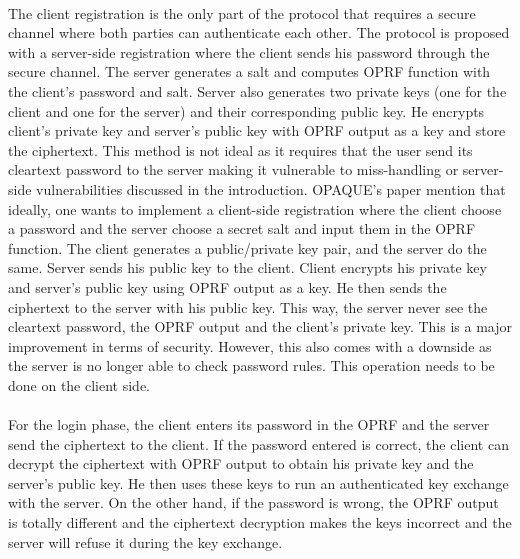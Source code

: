 ﻿\documentclass[../report.tex]{subfiles}
\begin{document}
\paragraph{}  \label{sec:opaque_register}
The client registration is the only part of the protocol that requires a secure channel where both parties can authenticate each other.
The protocol is proposed with a server-side registration where the client sends his password through the secure channel. The server generates a salt and computes OPRF function with the client's password and salt. Server also generates two private keys (one for the client and one for the server) and their corresponding public key. He encrypts client's private key and server's public key with OPRF output as a key and store the ciphertext.
This method is not ideal as it requires that the user send its cleartext password to the server making it vulnerable to miss-handling or server-side vulnerabilities discussed in the introduction.
OPAQUE's paper \cite{OPAQUE_Paper} mention that ideally, one wants to implement a client-side registration where the client choose a password and the server choose a secret salt and input them in the OPRF function. The client generates a public/private key pair, and the server do the same. Server sends his public key to the client. Client encrypts his private key and server's public key using OPRF output as a key. He then sends the ciphertext to the server with his public key.
This way, the server never see the cleartext password, the OPRF output and the client's private key. This is a major improvement in terms of security.
However, this also comes with a downside as the server is no longer able to check password rules. This operation needs to be done on the client side.


\paragraph{}
For the login phase, the client enters its password in the OPRF and the server send the ciphertext to the client.
If the password entered is correct, the client can decrypt the ciphertext with OPRF output to obtain his private key and the server's public key.
He then uses these keys to run an authenticated key exchange with the server.
On the other hand, if the password is wrong, the OPRF output is totally different and the ciphertext decryption makes the keys incorrect and the server will refuse it during the key exchange. %
\end{document}
